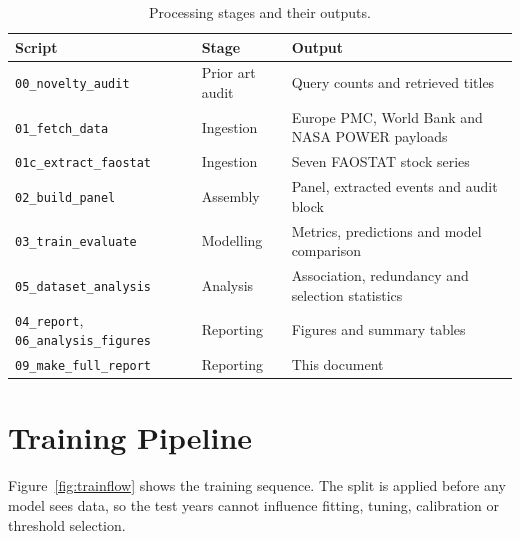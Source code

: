 \documentclass[10pt,openany]{report}
\begin{document}
\begin{table}[htbp]
\centering
\caption{Processing stages and their outputs.}
\label{tab:stages}
\small
\begin{tabular}{@{}>{\raggedright\arraybackslash}p{4.3cm}>{\raggedright\arraybackslash}p{4.0cm}>{\raggedright\arraybackslash}p{6.2cm}@{}}
\toprule
\textbf{Script} & \textbf{Stage} & \textbf{Output} \\
\midrule
\texttt{00\_novelty\_audit} & Prior art audit & Query counts and retrieved titles \\
\texttt{01\_fetch\_data} & Ingestion & Europe PMC, World Bank and NASA POWER payloads \\
\texttt{01c\_extract\_faostat} & Ingestion & Seven FAOSTAT stock series \\
\texttt{02\_build\_panel} & Assembly & Panel, extracted events and audit block \\
\texttt{03\_train\_evaluate} & Modelling & Metrics, predictions and model comparison \\
\texttt{05\_dataset\_analysis} & Analysis & Association, redundancy and selection statistics \\
\texttt{04\_report}, \texttt{06\_analysis\_figures} & Reporting & Figures and summary tables \\
\texttt{09\_make\_full\_report} & Reporting & This document \\
\bottomrule
\end{tabular}
\end{table}

\section{Training Pipeline}

Figure~\ref{fig:trainflow} shows the training sequence. The split is applied before any model
sees data, so the test years cannot influence fitting, tuning, calibration or threshold selection.
\end{document}
